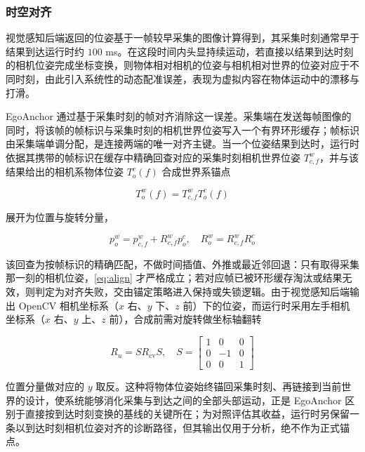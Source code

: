 \documentclass[review]{vgtc}
\begin{document}
\subsubsection{时空对齐}\label{sec:alignment}


视觉感知后端返回的位姿基于一帧较早采集的图像计算得到，其采集时刻通常早于结果到达运行时约 $100$ ms。在这段时间内头显持续运动，若直接以结果到达时刻的相机位姿完成坐标变换，则物体相对相机的位姿与相机相对世界的位姿对应于不同时刻，由此引入系统性的动态配准误差，表现为虚拟内容在物体运动中的漂移与打滑。

EgoAnchor 通过基于采集时刻的帧对齐消除这一误差。采集端在发送每帧图像的同时，将该帧的帧标识与采集时刻的相机世界位姿写入一个有界环形缓存；帧标识由采集端单调分配，是连接两端的唯一对齐主键。当一个位姿结果到达时，运行时依据其携带的帧标识在缓存中精确回查对应的采集时刻相机世界位姿 $T^w_{c,f}$，并与该结果给出的相机系物体位姿 $T^c_o(f)$ 合成世界系锚点

\begin{equation}
T^w_o(f) = T^w_{c,f} T^c_o(f)
\label{eq:align}
\end{equation}


展开为位置与旋转分量，

\begin{equation}
p^w_o = p^w_{c,f} + R^w_{c,f} p^c_o, \quad R^w_o = R^w_{c,f} R^c_o
\label{eq:align-pr}
\end{equation}


该回查为按帧标识的精确匹配，不做时间插值、外推或最近邻回退：只有取得采集那一刻的相机位姿，\ref{eq:align} 才严格成立；若对应帧已被环形缓存淘汰或结果无效，则判定为对齐失败，交由锚定策略进入保持或失锁逻辑。由于视觉感知后端输出 OpenCV 相机坐标系（$x$ 右、$y$ 下、$z$ 前）下的位姿，而运行时采用左手相机坐标系（$x$ 右、$y$ 上、$z$ 前），合成前需对旋转做坐标轴翻转

\begin{equation}
R_u = S R_{\mathrm{cv}} S, \quad S = \begin{bmatrix}1 & 0 & 0 \\ 0 & -1 & 0 \\ 0 & 0 & 1\end{bmatrix}
\label{eq:axisflip}
\end{equation}


位置分量做对应的 $y$ 取反。这种将物体位姿始终锚回采集时刻、再链接到当前世界的设计，使系统能够消化采集与到达之间的全部头部运动，正是 EgoAnchor 区别于直接按到达时刻变换的基线的关键所在；为对照评估其收益，运行时另保留一条以到达时刻相机位姿对齐的诊断路径，但其输出仅用于分析，绝不作为正式锚点。
\end{document}
